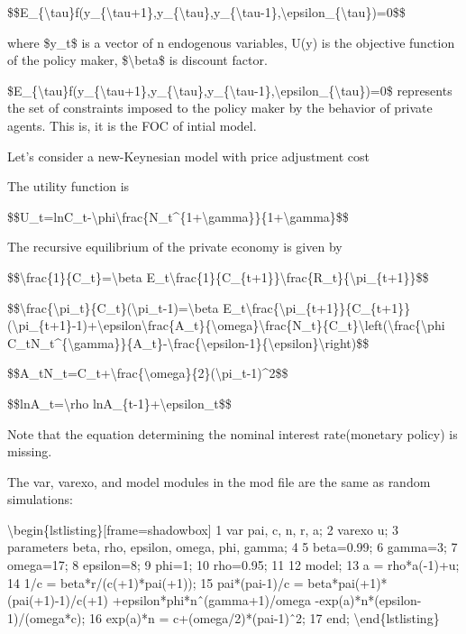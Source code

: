 \documentclass[10pt,math=newtx,citestyle=gb7714-2015,bibstyle=gb7714-2015]{elegantbook}
\begin{document}
	\$\$E\_\{\textbackslash{}tau\}f(y\_\{\textbackslash{}tau+1\},y\_\{\textbackslash{}tau\},y\_\{\textbackslash{}tau-1\},\textbackslash{}epsilon\_\{\textbackslash{}tau\})=0\$\$
	
	where \$y\_t\$ is a vector of n endogenous variables, U(y) is the objective function of the policy maker, \$\textbackslash{}beta\$ is discount factor.
	
	\$E\_\{\textbackslash{}tau\}f(y\_\{\textbackslash{}tau+1\},y\_\{\textbackslash{}tau\},y\_\{\textbackslash{}tau-1\},\textbackslash{}epsilon\_\{\textbackslash{}tau\})=0\$ represents the set of constraints imposed to the policy maker by the behavior of private agents. This is, it is the FOC of intial model.
	
	Let’s consider a new-Keynesian model with price adjustment cost
	
	The utility function is
	
	\$\$U\_t=lnC\_t-\textbackslash{}phi\textbackslash{}frac\{N\_t\^{}\{1+\textbackslash{}gamma\}\}\{1+\textbackslash{}gamma\}\$\$
	
	The recursive equilibrium of the private economy is given by
	
	\$\$\textbackslash{}frac\{1\}\{C\_t\}=\textbackslash{}beta E\_t\textbackslash{}frac\{1\}\{C\_\{t+1\}\}\textbackslash{}frac\{R\_t\}\{\textbackslash{}pi\_\{t+1\}\}\$\$
	
	\$\$\textbackslash{}frac\{\textbackslash{}pi\_t\}\{C\_t\}(\textbackslash{}pi\_t-1)=\textbackslash{}beta E\_t\textbackslash{}frac\{\textbackslash{}pi\_\{t+1\}\}\{C\_\{t+1\}\}(\textbackslash{}pi\_\{t+1\}-1)+\textbackslash{}epsilon\textbackslash{}frac\{A\_t\}\{\textbackslash{}omega\}\textbackslash{}frac\{N\_t\}\{C\_t\}\textbackslash{}left(\textbackslash{}frac\{\textbackslash{}phi C\_tN\_t\^{}\{\textbackslash{}gamma\}\}\{A\_t\}-\textbackslash{}frac\{\textbackslash{}epsilon-1\}\{\textbackslash{}epsilon\}\textbackslash{}right)\$\$
	
	\$\$A\_tN\_t=C\_t+\textbackslash{}frac\{\textbackslash{}omega\}\{2\}(\textbackslash{}pi\_t-1)\^{}2\$\$
	
	\$\$lnA\_t=\textbackslash{}rho lnA\_\{t-1\}+\textbackslash{}epsilon\_t\$\$
	
	Note that the equation determining the nominal interest rate(monetary policy) is missing.
	
	The var, varexo, and model modules in the mod file are the same as random simulations:
	
	\textbackslash{}begin\{lstlisting\}[frame=shadowbox]
	1 var pai, c, n, r, a;
	2 varexo u;
	3 parameters beta, rho, epsilon, omega, phi, gamma;
	4
	5 beta=0.99;
	6 gamma=3;
	7 omega=17;
	8 epsilon=8;
	9 phi=1;
	10 rho=0.95;
	11
	12 model;
	13 a = rho*a(-1)+u;
	14 1/c = beta*r/(c(+1)*pai(+1));
	15 pai*(pai-1)/c = beta*pai(+1)*(pai(+1)-1)/c(+1)
	+epsilon*phi*nˆ(gamma+1)/omega
	-exp(a)*n*(epsilon-1)/(omega*c);
	16 exp(a)*n = c+(omega/2)*(pai-1)ˆ2;
	17 end;
	\textbackslash{}end\{lstlisting\}
	
\end{document}
